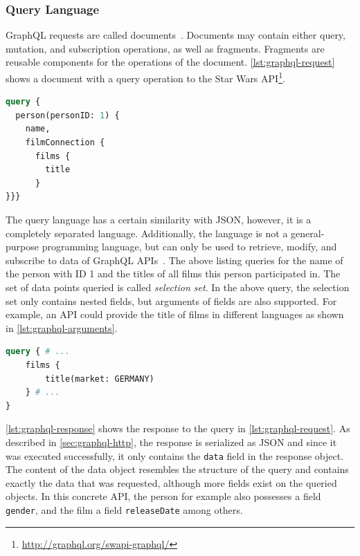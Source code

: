 \subsubsection{Query Language}\label{sec:graphql-query-lang}

GraphQL requests are called documents~\cite{Facebook2018}.
Documents may contain either query, mutation, and subscription operations, as well as fragments.
Fragments are reusable components for the operations of the document.
\autoref{lst:graphql-request} shows a document with a query operation to the Star Wars \ac{API}\footnote{\url{http://graphql.org/swapi-graphql/}}.

\begin{minipage}{\linewidth}
\begin{lstlisting}[language=graphql, caption={GraphQL Request}, label={lst:graphql-request}]
query {
  person(personID: 1) {
    name,
    filmConnection {
      films {
        title
      }
}}}
\end{lstlisting}
\end{minipage}

The query language has a certain similarity with \ac{JSON}, however, it is a completely separated language.
Additionally, the language is not a general-purpose programming language, but can only be used to retrieve, modify, and subscribe to data of GraphQL \acp{API}~\cite{Facebook2018}.
The above listing queries for the name of the person with ID 1 and the titles of all films this person participated in.
The set of data points queried is called \textit{selection set}.
In the above query, the selection set only contains nested fields, but arguments of fields are also supported.
For example, an \ac{API} could provide the title of films in different languages as shown in  \autoref{lst:graphql-arguments}.

\begin{lstlisting}[language=graphql, caption={GraphQL Request with Field Arguments}, label={lst:graphql-arguments}]
query { # ...
    films {
        title(market: GERMANY)
    } # ...
}
\end{lstlisting}

\autoref{lst:graphql-response} shows the response to the query in \autoref{lst:graphql-request}.
As described in \autoref{sec:graphql-http}, the response is serialized as \ac{JSON} and since it was executed successfully, it only contains the \texttt{data} field in the response object.
The content of the data object resembles the structure of the query and contains exactly the data that was requested, although more fields exist on the queried objects.
In this concrete \ac{API}, the person for example also possesses a field \texttt{gender}, and the film a field \texttt{releaseDate} among others.

